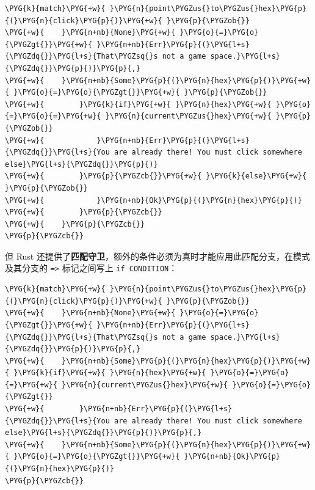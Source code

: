 \begin{Verbatim}[commandchars=\\\{\},breaklines=true,breakanywhere=true,fontsize=\codefont,xleftmargin=17bp]
\PYG{k}{match}\PYG{+w}{ }\PYG{n}{point\PYGZus{}to\PYGZus{}hex}\PYG{p}{(}\PYG{n}{click}\PYG{p}{)}\PYG{+w}{ }\PYG{p}{\PYGZob{}}
\PYG{+w}{    }\PYG{n+nb}{None}\PYG{+w}{ }\PYG{o}{=}\PYG{o}{\PYGZgt{}}\PYG{+w}{ }\PYG{n+nb}{Err}\PYG{p}{(}\PYG{l+s}{\PYGZdq{}}\PYG{l+s}{That\PYGZsq{}s not a game space.}\PYG{l+s}{\PYGZdq{}}\PYG{p}{)}\PYG{p}{,}
\PYG{+w}{    }\PYG{n+nb}{Some}\PYG{p}{(}\PYG{n}{hex}\PYG{p}{)}\PYG{+w}{ }\PYG{o}{=}\PYG{o}{\PYGZgt{}}\PYG{+w}{ }\PYG{p}{\PYGZob{}}
\PYG{+w}{        }\PYG{k}{if}\PYG{+w}{ }\PYG{n}{hex}\PYG{+w}{ }\PYG{o}{=}\PYG{o}{=}\PYG{+w}{ }\PYG{n}{current\PYGZus{}hex}\PYG{+w}{ }\PYG{p}{\PYGZob{}}
\PYG{+w}{            }\PYG{n+nb}{Err}\PYG{p}{(}\PYG{l+s}{\PYGZdq{}}\PYG{l+s}{You are already there! You must click somewhere else}\PYG{l+s}{\PYGZdq{}}\PYG{p}{)}
\PYG{+w}{        }\PYG{p}{\PYGZcb{}}\PYG{+w}{ }\PYG{k}{else}\PYG{+w}{ }\PYG{p}{\PYGZob{}}
\PYG{+w}{            }\PYG{n+nb}{Ok}\PYG{p}{(}\PYG{n}{hex}\PYG{p}{)}
\PYG{+w}{        }\PYG{p}{\PYGZcb{}}
\PYG{+w}{    }\PYG{p}{\PYGZcb{}}
\PYG{p}{\PYGZcb{}}
\end{Verbatim}

但 Rust 还提供了\textbf{匹配守卫}，额外的条件必须为真时才能应用此匹配分支，在模式及其分支的 \texttt{=>} 标记之间写上 \texttt{if CONDITION}：

\begin{Verbatim}[commandchars=\\\{\},breaklines=true,breakanywhere=true,fontsize=\codefont,xleftmargin=17bp]
\PYG{k}{match}\PYG{+w}{ }\PYG{n}{point\PYGZus{}to\PYGZus{}hex}\PYG{p}{(}\PYG{n}{click}\PYG{p}{)}\PYG{+w}{ }\PYG{p}{\PYGZob{}}
\PYG{+w}{    }\PYG{n+nb}{None}\PYG{+w}{ }\PYG{o}{=}\PYG{o}{\PYGZgt{}}\PYG{+w}{ }\PYG{n+nb}{Err}\PYG{p}{(}\PYG{l+s}{\PYGZdq{}}\PYG{l+s}{That\PYGZsq{}s not a game space.}\PYG{l+s}{\PYGZdq{}}\PYG{p}{)}\PYG{p}{,}
\PYG{+w}{    }\PYG{n+nb}{Some}\PYG{p}{(}\PYG{n}{hex}\PYG{p}{)}\PYG{+w}{ }\PYG{k}{if}\PYG{+w}{ }\PYG{n}{hex}\PYG{+w}{ }\PYG{o}{=}\PYG{o}{=}\PYG{+w}{ }\PYG{n}{current\PYGZus{}hex}\PYG{+w}{ }\PYG{o}{=}\PYG{o}{\PYGZgt{}}
\PYG{+w}{        }\PYG{n+nb}{Err}\PYG{p}{(}\PYG{l+s}{\PYGZdq{}}\PYG{l+s}{You are already there! You must click somewhere else}\PYG{l+s}{\PYGZdq{}}\PYG{p}{)}\PYG{p}{,}
\PYG{+w}{    }\PYG{n+nb}{Some}\PYG{p}{(}\PYG{n}{hex}\PYG{p}{)}\PYG{+w}{ }\PYG{o}{=}\PYG{o}{\PYGZgt{}}\PYG{+w}{ }\PYG{n+nb}{Ok}\PYG{p}{(}\PYG{n}{hex}\PYG{p}{)}
\PYG{p}{\PYGZcb{}}
\end{Verbatim}

